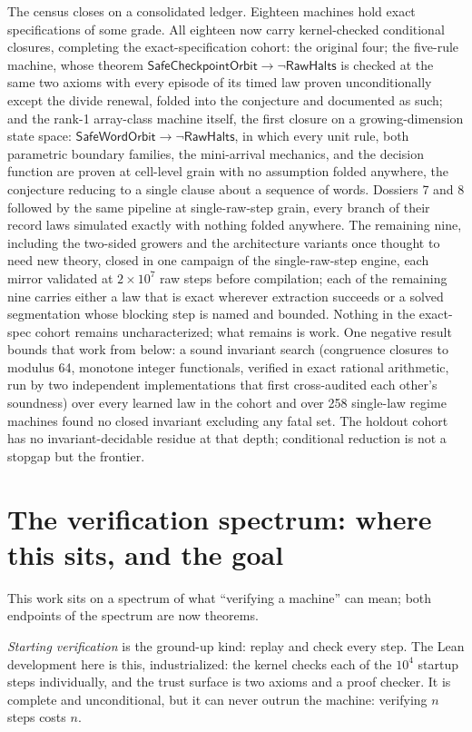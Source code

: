 \documentclass[11pt]{article}
\newcommand{\Halts}{\mathsf{RawHalts}}
\begin{document}
The census closes on a consolidated ledger. Eighteen machines hold
exact specifications of some grade. All eighteen now carry kernel-checked conditional closures,
completing the exact-specification cohort: the original four; the five-rule machine,
whose theorem
$\mathsf{SafeCheckpointOrbit} \rightarrow \lnot \Halts$ is
checked at the same two axioms with every episode of its timed law
proven unconditionally except the divide renewal, folded into the
conjecture and documented as such; and the rank-1 array-class
machine itself, the first closure on a growing-dimension state
space: $\mathsf{SafeWordOrbit} \rightarrow \lnot \Halts$, in
which every unit rule, both parametric boundary families, the
mini-arrival mechanics, and the decision function are proven at
cell-level grain with no assumption folded anywhere, the conjecture
reducing to a single clause about a sequence of words. Dossiers 7 and 8 followed by the same pipeline at
single-raw-step grain, every branch of their record laws simulated
exactly with nothing folded anywhere. The remaining nine, including the two-sided growers and the
architecture variants once thought to need new theory, closed in one
campaign of the single-raw-step engine, each mirror validated at
$2\times10^{7}$ raw steps before compilation; each of the remaining nine carries either a law that is
exact wherever extraction succeeds or a solved segmentation whose
blocking step is named and bounded.
Nothing in the exact-spec cohort remains uncharacterized; what
remains is work. One negative result bounds that work from below: a
sound invariant search (congruence closures to modulus 64, monotone
integer functionals, verified in exact rational arithmetic, run by
two independent implementations that first cross-audited each
other's soundness) over every learned law in the cohort and over
258 single-law regime machines found no closed invariant excluding
any fatal set. The holdout cohort has no invariant-decidable
residue at that depth; conditional reduction is not a stopgap but
the frontier.

\section{The verification spectrum: where this sits, and the goal}
This work sits on a spectrum of what ``verifying a machine'' can
mean; both endpoints of the spectrum are now theorems.

\emph{Starting verification} is the ground-up kind: replay and check
every step. The Lean development here is this, industrialized: the
kernel checks each of the $10^{4}$ startup steps individually, and the
trust surface is two axioms and a proof checker. It is complete and
unconditional, but it can never outrun the machine: verifying $n$
steps costs $n$.
\end{document}
